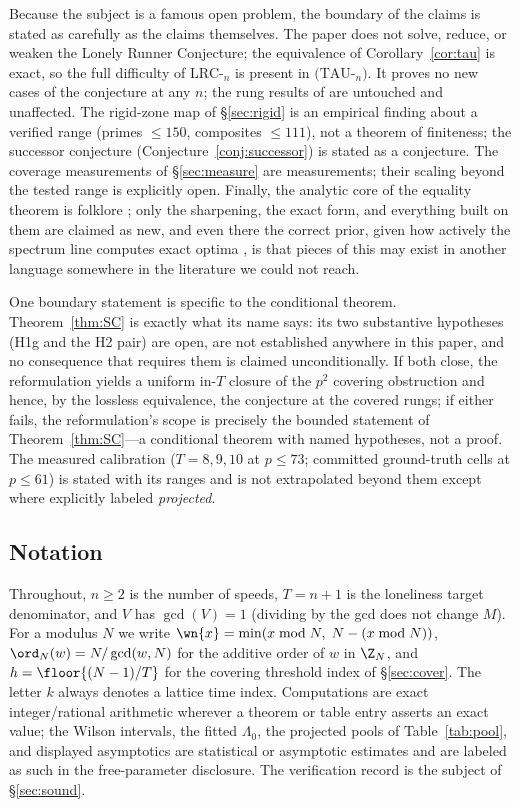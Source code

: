 Because the subject is a famous open problem, the boundary of the claims
is stated as carefully as the claims themselves. The paper does not solve,
reduce, or weaken the Lonely Runner Conjecture; the equivalence of
Corollary~\ref{cor:tau} is exact, so the full difficulty of
$\mathrm{LRC}$-$_n$ is present in $(\mathrm{TAU}$-$_n)$. It proves no new
cases of the conjecture at any $n$; the rung results of
\cite{Rosenfeld8,Trakulthongchai,Sungkawichai,Allikvere} are untouched and
unaffected. The rigid-zone map of \S\ref{sec:rigid} is an empirical
finding about a verified range (primes $\le 150$, composites $\le 111$),
not a theorem of finiteness; the successor conjecture
(Conjecture~\ref{conj:successor}) is stated as a conjecture. The coverage
measurements of \S\ref{sec:measure} are measurements; their scaling
beyond the tested range is explicitly open. Finally, the analytic core of
the equality theorem is folklore \cite{Tao-blog}; only the sharpening, the
exact form, and everything built on them are claimed as new, and even
there the correct prior, given how actively the spectrum line computes
exact optima \cite{Cordella}, is that pieces of this may exist in another
language somewhere in the literature we could not reach.

One boundary statement is specific to the conditional theorem.
Theorem~\ref{thm:SC} is exactly what its name says: its two substantive
hypotheses (H1g and the H2 pair) are open, are not established anywhere
in this paper, and no consequence that requires them is claimed
unconditionally. If both close, the reformulation yields a uniform
in-$T$ closure of the $p^2$ covering obstruction and hence, by the
lossless equivalence, the conjecture at the covered rungs; if either
fails, the reformulation's scope is precisely the bounded statement of
Theorem~\ref{thm:SC}---a conditional theorem with named hypotheses, not
a proof. The measured calibration ($T=8,9,10$ at $p\le73$; committed
ground-truth cells at $p\le61$) is stated with its ranges and is not
extrapolated beyond them except where explicitly labeled
\emph{projected}.

\subsection{Notation}

Throughout, $n\ge 2$ is the number of speeds, $T=n+1$ is the loneliness
target denominator, and $V$ has $\gcd(V)=1$ (dividing by the gcd does
not change $M$). For a modulus $N$ we write $\wn{x}=\min(x\bmod N,\;
N-(x\bmod N))$, $\ord_N(w)=N/\gcd(w,N)$ for the additive order of $w$
in $\Z_N$, and $h=\floor{(N-1)/T}$ for the covering threshold index
of \S\ref{sec:cover}. The letter $k$ always denotes a lattice time
index. Computations are exact integer/rational arithmetic wherever a
theorem or table entry asserts an exact value; the Wilson intervals,
the fitted $\Lambda_0$, the projected pools of Table~\ref{tab:pool},
and displayed asymptotics are statistical or asymptotic estimates and
are labeled as such in the free-parameter disclosure. The verification
record is the subject of \S\ref{sec:sound}.
